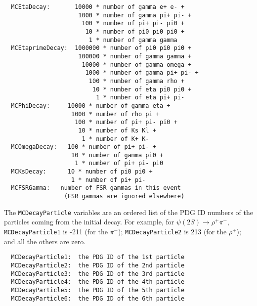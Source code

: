 \documentclass[11pt]{article}
\begin{document}
\begin{verbatim}
  MCEtaDecay:       10000 * number of gamma e+ e- +
                     1000 * number of gamma pi+ pi- +
                      100 * number of pi+ pi- pi0 +
                       10 * number of pi0 pi0 pi0 +
                        1 * number of gamma gamma
  MCEtaprimeDecay:  1000000 * number of pi0 pi0 pi0 +
                     100000 * number of gamma gamma +
                      10000 * number of gamma omega +
                       1000 * number of gamma pi+ pi- +
                        100 * number of gamma rho +
                         10 * number of eta pi0 pi0 +
                          1 * number of eta pi+ pi-
  MCPhiDecay:     10000 * number of gamma eta +
                   1000 * number of rho pi +
                    100 * number of pi+ pi- pi0 +
                     10 * number of Ks Kl +
                      1 * number of K+ K-
  MCOmegaDecay:   100 * number of pi+ pi- +
                   10 * number of gamma pi0 +
                    1 * number of pi+ pi- pi0
  MCKsDecay:      10 * number of pi0 pi0 +
                   1 * number of pi+ pi-
  MCFSRGamma:   number of FSR gammas in this event
                 (FSR gammas are ignored elsewhere)
\end{verbatim}
The {\tt MCDecayParticle} variables are an ordered list of the PDG ID numbers of the particles coming from the initial decay.  For example, for $\psi(2S)\to\rho^+\pi^-$, {\tt MCDecayParticle1} is -211 (for the $\pi^-$); {\tt MCDecayParticle2} is 213 (for the $\rho^+$); and all the others are zero.
\begin{verbatim}
  MCDecayParticle1:  the PDG ID of the 1st particle
  MCDecayParticle2:  the PDG ID of the 2nd particle
  MCDecayParticle3:  the PDG ID of the 3rd particle
  MCDecayParticle4:  the PDG ID of the 4th particle
  MCDecayParticle5:  the PDG ID of the 5th particle
  MCDecayParticle6:  the PDG ID of the 6th particle
\end{verbatim}
\end{document}
